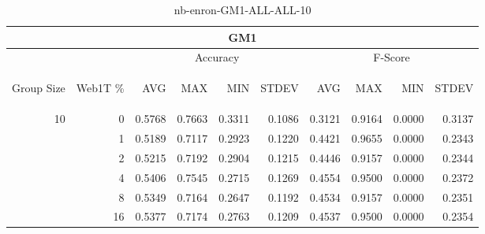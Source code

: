 \begin{center}
\begin{table}[htbp]
\begin{tabular}{ | r | r | r | r | r | r | r | r | r | r |}
\hline
\multicolumn{10}{|c|}{GM1}\\
\hline
 & & \multicolumn{4}{|c|}{Accuracy} & \multicolumn{4}{|c|}{F-Score}\\ \cline{3-10}
\begin{sideways}Group Size\end{sideways} & \begin{sideways}Web1T \%\end{sideways} & \begin{sideways}AVG\end{sideways} & \begin{sideways}MAX\end{sideways} & \begin{sideways}MIN\end{sideways} & \begin{sideways}STDEV\end{sideways} & \begin{sideways}AVG\end{sideways} & \begin{sideways}MAX\end{sideways} & \begin{sideways}MIN\end{sideways} & \begin{sideways}STDEV\end{sideways}\\
\hline
\multirow{6}{*}{10}
 & 0 & 0.5768 & 0.7663 & 0.3311 & 0.1086 & 0.3121 & 0.9164 & 0.0000 & 0.3137\\ \cline{2-10}
 & 1 & 0.5189 & 0.7117 & 0.2923 & 0.1220 & 0.4421 & 0.9655 & 0.0000 & 0.2343\\ \cline{2-10}
 & 2 & 0.5215 & 0.7192 & 0.2904 & 0.1215 & 0.4446 & 0.9157 & 0.0000 & 0.2344\\ \cline{2-10}
 & 4 & 0.5406 & 0.7545 & 0.2715 & 0.1269 & 0.4554 & 0.9500 & 0.0000 & 0.2372\\ \cline{2-10}
 & 8 & 0.5349 & 0.7164 & 0.2647 & 0.1192 & 0.4534 & 0.9157 & 0.0000 & 0.2351\\ \cline{2-10}
 & 16 & 0.5377 & 0.7174 & 0.2763 & 0.1209 & 0.4537 & 0.9500 & 0.0000 & 0.2354\\ \cline{2-10}
\hline
\end{tabular}
\caption{nb-enron-GM1-ALL-ALL-10}
\end{table}
\end{center}

